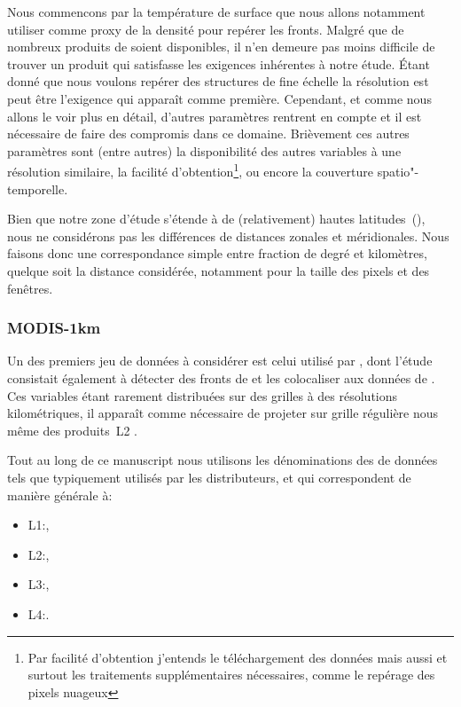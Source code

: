Nous commencons par la température de surface que nous allons notamment utiliser comme proxy de la densité pour repérer les fronts.
Malgré que de nombreux produits de  soient disponibles, il n'en demeure pas moins difficile de trouver un produit qui satisfasse les exigences inhérentes à notre étude.
Étant donné que nous voulons repérer des structures de fine échelle la résolution est peut être l’exigence qui apparaît comme première.
Cependant, et comme nous allons le voir plus en détail, d'autres paramètres rentrent en compte et il est nécessaire de faire des compromis dans ce domaine.
Brièvement ces autres paramètres sont (entre autres) la disponibilité des autres variables à une résolution similaire, la facilité d'obtention\footnote{%
  Par facilité d'obtention j'entends le téléchargement des données mais aussi et surtout les traitements supplémentaires nécessaires, comme le repérage des pixels nuageux },
ou encore la couverture spatio"-temporelle.

\begin{note}
  Bien que notre zone d'étude s'étende à de (relativement) hautes latitudes~(), nous ne considérons pas les différences de distances zonales et méridionales.
  Nous faisons donc une correspondance simple entre fraction de degré et kilomètres, quelque soit la distance considérée, notamment pour la taille des pixels et des fenêtres.
\end{note}

\subsubsection{MODIS-1km}

Un des premiers jeu de données  à considérer est celui utilisé par \textcite{liu_2016}, dont l'étude consistait également à détecter des fronts de  et les colocaliser aux données de .
Ces variables étant rarement distribuées sur des grilles à des résolutions kilométriques, il apparaît comme nécessaire de projeter sur grille régulière nous même des produits~L2 .

\begin{note}
  Tout au long de ce manuscript nous utilisons les dénominations des  de données tels que typiquement utilisés par les distributeurs, et qui correspondent de manière générale à:
  \begin{itemize}
    \item L1:,
    \item L2:,
    \item L3:,
    \item L4:.
  \end{itemize}
\end{note}

